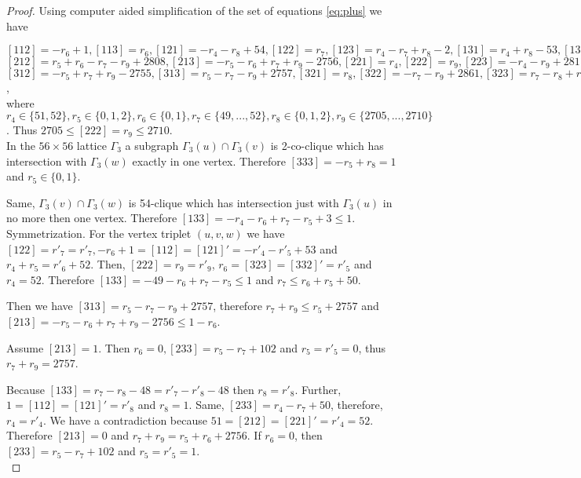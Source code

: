\documentclass{article}
\theoremstyle{definition}
\theoremstyle{definition}
\theoremstyle{remark}
\begin{document}
\begin{proof} Using computer aided simplification of the set of equations \ref{eq:plus} we have

$[112] = -r_{6} +1, [113] = r_{6} , [121] = -r_{4} -r_{8} +54, [122] = r_{7} , [123] = r_{4} -r_{7} +r_{8} -2, [131] = r_{4} +r_{8} -53, [132] = r_{6} - r_{7} + 51, [133] = -r_{4} - r_{6} + r_{7} - r_{8} + 4;$ \\
$[212] = r_{5} + r_{6} - r_{7} - r_{9} + 2808, [213] = -r_{5} - r_{6} + r_{7} + r_{9} - 2756, [221] = r_{4} , [222] = r_{9} , [223] = -r_{4} - r_{9} + 2811, [231] = -r_{4} + 52, [232] = -r_{5} - r_{6} + r_{7} + 3, [233] = r_{4} + r_{5} + r_{6} - r_{7} + 50;$ \\
$[312] = -r_{5} + r_{7} + r_{9} - 2755, [313] = r_{5} - r_{7} - r_{9} + 2757, [321] = r_{8} , [322] = -r_{7} - r_{9} + 2861, [323] = r_{7} - r_{8} + r_{9} - 2755, [331] = -r_{8} + 2, [332] = r_{5} , [333] = -r_{5} + r_{8}$, \\

where $r_4 \in \{51, 52\}, r_5 \in \{0, 1, 2\}, r_6 \in  \{0, 1\}, r_7 \in \{49, ..., 52\}, r_8 \in \{0, 1, 2\}, r_9 \in \{2705, ..., 2710\}$.
Thus $2705 \le [222] = r_9 \le 2710$. \\

In the $56 \times 56$ lattice $\Gamma_3$ a subgraph $\Gamma_3(u) \cap \Gamma_3(v)$ is 2-co-clique which has intersection with $\Gamma_3(w)$ exactly in one vertex. Therefore $[333] = -r_5 + r_8 = 1$ and $r_5 \in \{0, 1\}$.

Same, $\Gamma_3(v) \cap \Gamma_3(w)$ is 54-clique which has intersection just with $\Gamma_3(u)$ in no more then one vertex. Therefore $[133] = - r_4 - r_6 + r_7 - r_5 + 3 \le 1$. \\

Symmetrization. For the vertex triplet  $(u, v, w)$ we have $[122] = r'_7 = r'_7 , -r_6 + 1 = [112] = [121]' = -r'_4 - r'_5 + 53$ and $r_4 + r_5 = r'_6 + 52$. Then, $[222] = r_9 = r'_9$, $r_6 = [323] = [332]' = r'_5$ and  $r_4 = 52$. Therefore $[133] = -49 - r_6 + r_7 - r_5 \le 1$ and $ r_7 \le r_6 + r_5 + 50$.

Then we have $[313] = r_5 - r_7 - r_9 + 2757$, therefore
$r_7 + r_9 \le r_5 + 2757$ and $[213] = -r_5 - r_6 + r_7 + r_9 - 2756 \le 1 - r_6$.

Assume $[213] = 1$. Then $r_6 = 0, [233] = r_5 -r_7 + 102$ and $r_5 = r'_5 = 0$, thus $r_7 +r_9 = 2757$.

Because $[133] = r_7 - r_8 - 48 = r'_7 - r'_8 - 48$ then $r_8 = r'_8$. Further, $1 = [112] = [121]' = r'_8$ and $r_8 = 1$. Same,
$[233] = r_4 - r_7 + 50$, therefore, $r_4 = r'_4$. We have a contradiction because $51 = [212] = [221]' = r'_4 = 52$. Therefore $[213] = 0$ and $r_7 + r_9 = r_5 + r_6 + 2756$. If $r_6 = 0$, then $[233] = r_5 - r_7 + 102$ and $r_5 = r'_5 = 1$.\\


\end{proof}
\end{document}
